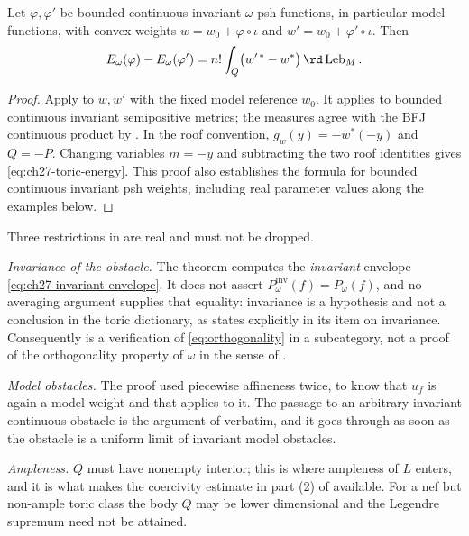 \begin{corollary}
\label{cor:ch27-toric-energy}
Let $\varphi,\varphi'$ be bounded continuous invariant $\omega$-psh
functions, in particular model functions, with
convex weights $w=w_0+\varphi\circ\iota$ and
$w'=w_0+\varphi'\circ\iota$.  Then
\begin{equation}\label{eq:ch27-toric-energy}
 E_\omega(\varphi)-E_\omega(\varphi')
 =n!\int_Q\bigl(w'^{\,*}-w^{*}\bigr)\,\rd\operatorname{Leb}_M .
\end{equation}
\end{corollary}

\begin{proof}
Apply  to $w,w'$ with the fixed model
reference $w_0$.  It applies to bounded continuous invariant semipositive
metrics; the measures agree with the BFJ continuous product by
.
In the roof convention, $g_w(y)=-w^*(-y)$ and $Q=-P$.
Changing variables $m=-y$ and subtracting the two roof identities gives
\eqref{eq:ch27-toric-energy}.
This proof also establishes the formula for bounded continuous invariant
psh weights, including real parameter values along the examples below.
\end{proof}

\begin{remark}
\label{rem:ch27-toric-scope}
Three restrictions in  are real and must
not be dropped.

\emph{Invariance of the obstacle.}  The theorem computes the
\emph{invariant} envelope \eqref{eq:ch27-invariant-envelope}.  It does not
assert $P^{\mathrm{inv}}_\omega(f)=P_\omega(f)$, and no averaging argument
supplies that equality: invariance is a hypothesis and not a conclusion in
the toric dictionary, as  states explicitly
in its item on invariance.  Consequently
 is a verification of
\eqref{eq:orthogonality} in a subcategory, not a proof of the orthogonality
property of $\omega$ in the sense of
.

\emph{Model obstacles.}  The proof used piecewise affineness twice, to know
that $u_f$ is again a model weight and that
 applies to it.  The passage to an arbitrary
invariant continuous obstacle is the argument of
 verbatim, and it goes through
as soon as the obstacle is a uniform limit of invariant model obstacles.

\emph{Ampleness.}  $Q$ must have nonempty interior; this is where
ampleness of $L$ enters, and it is what makes the coercivity estimate in
part (2) of  available.  For a nef but
non-ample toric class the body $Q$ may be lower dimensional and the
Legendre supremum need not be attained.
\end{remark}

